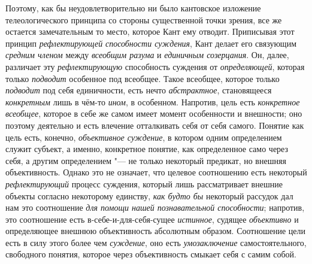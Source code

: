 Поэтому, как бы неудовлетворительно ни было кантовское
изложение телеологического принципа со стороны существенной точки зрения,
все же остается замечательным то место, которое Кант ему отводит.
Приписывая этот принцип
{\em рефлектирующей}
{\em способности суждения},
Кант делает его связующим
{\em средним членом}
между {\em всеобщим
разума} и {\em единичным
созерцания}. Он, далее, различает эту
{\em рефлектирующую}
способность суждения от
{\em определяющей},
которая только
{\em подводит} особенное
под всеобщее. Такое всеобщее, которое только
{\em подводит} под себя
единичности, есть нечто
{\em абстрактное},
становящееся
{\em конкретным} лишь в
чём-то {\em ином}, в
особенном. Напротив, цель есть
{\em конкретное всеобщее},
которое в себе же самом имеет момент особенности и внешности;
оно поэтому деятельно и есть влечение отталкивать себя от себя самого.
Понятие как цель есть, конечно,
{\em объективное суждение},
в котором одним определением служит субъект, а именно,
конкретное понятие, как определенное само через себя, а другим
определением "--- не только некоторый предикат, но внешняя
объективность. Однако это не означает, что целевое соотношению есть
некоторый {\em рефлектирующий}
процесс суждения, который лишь рассматривает внешние объекты
согласно некоторому единству, {\em как
будто бы} некоторый рассудок дал нам это соотношение
{\em для помощи нашей познавательной
способности}; напротив, это соотношение есть
в-себе-и-для-себя-сущее {\em истинное},
судящее {\em объективно}
и определяющее внешнюю объективность абсолютным образом.
Соотношение цели есть в силу этого более чем
{\em суждение}, оно есть
{\em умозаключение}
самостоятельного, свободного понятия, которое через
объективность смыкает себя с самим собой.

